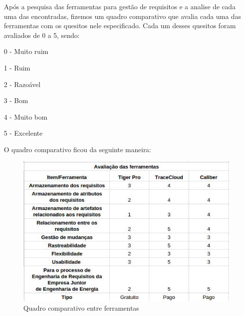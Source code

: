 Após a pesquisa das ferramentas para gestão de requisitos e a analise de cada uma das encontradas, fizemos um quadro comparativo que avalia cada uma das ferramentas com os quesitos nele especificado. Cada um desses quesitos foram avaliados de 0 a 5, sendo:

0 - Muito ruim

1 - Ruim

2 - Razoável

3 - Bom

4 - Muito bom

5 - Excelente

O quadro comparativo ficou da seguinte maneira:
\begin{figure}[!htb]
\centering
\includegraphics[scale=0.7]{figuras/quadro.jpg}
\caption{Quadro comparativo entre ferramentas}
\end{figure}


